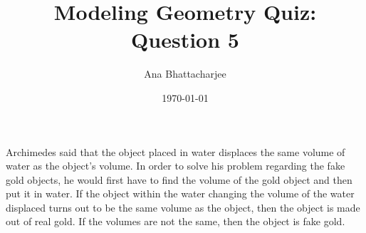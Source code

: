 \documentclass{article}
\begin{document}
\title{Modeling Geometry Quiz: Question 5}
\author{Ana Bhattacharjee}
\date{\today}
\maketitle

\begin{center}
Archimedes said that the object placed in water displaces the same volume of water as the object's volume. In order to solve his problem regarding the fake gold objects, he would first have to find the volume of the gold object and then put it in water. If the object within the water changing the volume of the water displaced turns out to be the same volume as the object, then the object is made out of real gold. If the volumes are not the same, then the object is fake gold. 
\end{center}
\end{document}
